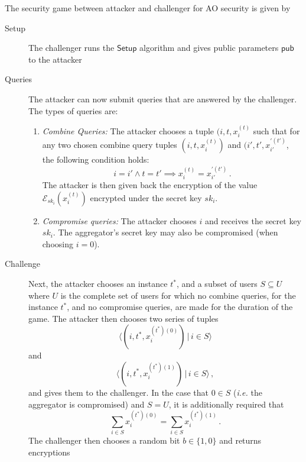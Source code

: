 \documentclass[twocolumn]{autart}
\begin{document}
The security game between attacker and challenger for AO security is given by
\begin{description}
    \item[Setup] The challenger runs the $\mathsf{Setup}$ algorithm and gives public parameters $\mathsf{pub}$ to the attacker
    \item[Queries] The attacker can now submit queries that are answered by the challenger. The types of queries are:
    \begin{enumerate}
        \item \textit{Combine Queries:} The attacker chooses a tuple $(i,t,x^{(t)}_i$ such that for any two chosen combine query tuples $(i,t,x^{(t)}_i)$ and $(i',t',x^{\prime(t')}_{i'}$, the following condition holds:
        \begin{equation*}
            i = i' \wedge t = t' \implies x^{(t)}_{i} = x^{\prime(t')}_{i'}\,.
        \end{equation*}
        The attacker is then given back the encryption of the value $\mathcal{E}_{sk_i}(x^{(t)}_i)$ encrypted under the secret key $sk_i$.
        \item \textit{Compromise queries:} The attacker chooses $i$ and receives the secret key $sk_i$. The aggregator's secret key may also be compromised (when choosing $i=0$).
    \end{enumerate} 
    \item[Challenge] Next, the attacker chooses an instance $t^*$, and a subset of users $S \subseteq U$ where $U$ is the complete set of users for which no combine queries, for the instance $t^*$, and no compromise queries, are made for the duration of the game. The attacker then chooses two series of tuples
    \begin{equation*}
        \langle(i,t^*,x^{(t^*)(0)}_i)\,|\,i \in S\rangle
    \end{equation*}
    and
    \begin{equation*}
        \langle(i,t^*,x^{(t^*)(1)}_i)\,|\, i \in S\rangle\,,
    \end{equation*}
    and gives them to the challenger. In the case that $0 \in S$ (\textit{i.e.} the aggregator is compromised) and $S = U$, it is additionally required that
    \begin{equation*}
        \sum_{i\in S} x^{(t^*)(0)}_i = \sum_{i \in S} x^{(t^*)(1)}_i\,.
    \end{equation*}
    The challenger then chooses a random bit $b \in \{1,0\}$ and returns encryptions 
    \begin{equation*}

\end{equation*}
\end{description}
\end{document}
